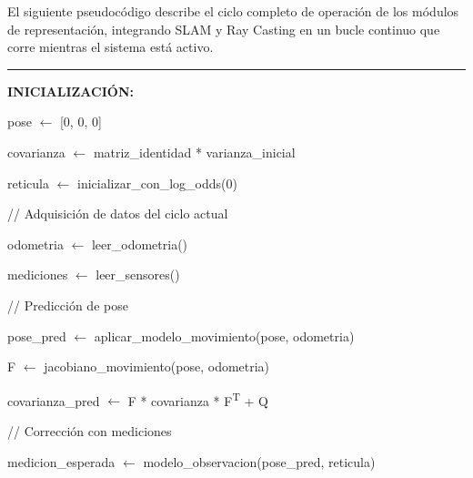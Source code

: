 El siguiente pseudocódigo describe el ciclo completo de operación de los módulos de
representación, integrando SLAM y Ray Casting en un bucle continuo que corre mientras
el sistema está activo.

\begin{center}
\label{alg:representacion}
\end{center}
\vspace{-1.8cm}
\rule{\textwidth}{0.4pt}
\vspace{-0.9cm}

\begin{algorithmic}[1]

\Statex \textbf{INICIALIZACIÓN:}

\State pose $\gets$ [0, 0, 0]

\State covarianza $\gets$
matriz\_identidad * varianza\_inicial

\State reticula $\gets$
inicializar\_con\_log\_odds(0)


\Statex


    \Statex \hspace{0.5cm}
    // Adquisición de datos del ciclo actual

    \State odometria $\gets$
    leer\_odometria()


    \State mediciones $\gets$
    leer\_sensores()


    \Statex

    \Statex \hspace{0.5cm}
    // Predicción de pose

    \State pose\_pred $\gets$
    aplicar\_modelo\_movimiento(pose, odometria)

    \State F $\gets$
    jacobiano\_movimiento(pose, odometria)

    \State covarianza\_pred $\gets$
    F * covarianza * F\textsuperscript{T} + Q

    \Statex

    \Statex \hspace{0.5cm}
    // Corrección con mediciones

    \State medicion\_esperada $\gets$
    modelo\_observacion(pose\_pred, reticula)


\end{algorithmic}

